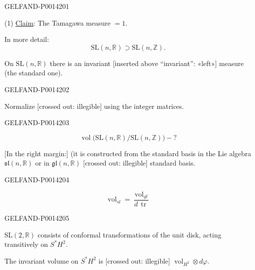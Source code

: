 \begin{GelfandAdjacentEvidence}{GELFAND-P001420}{1}


(1) \uline{Claim}: The Tamagawa measure \(=1\).

In more detail:
\[
\mathrm{SL}(n,\mathbb R)\supset\mathrm{SL}(n,\mathbb Z).
\]

On \(\mathrm{SL}(n,\mathbb R)\) there is an invariant
[inserted above “invariant”: «left»] measure (the standard one).
\end{GelfandAdjacentEvidence}
\begin{GelfandAdjacentEvidence}{GELFAND-P001420}{2}


Normalize [crossed out: illegible] using the integer matrices.
\end{GelfandAdjacentEvidence}
\begin{GelfandAdjacentEvidence}{GELFAND-P001420}{3}

\[
\operatorname{vol}\bigl(\mathrm{SL}(n,\mathbb R)/\mathrm{SL}(n,\mathbb Z)\bigr)-?
\]

[In the right margin:]
(it is constructed from the standard basis in the Lie algebra \(\mathfrak{sl}(n,\mathbb R)\) or in \(\mathfrak{gl}(n,\mathbb R)\)
[crossed out: illegible] standard basis.
\end{GelfandAdjacentEvidence}
\begin{GelfandAdjacentEvidence}{GELFAND-P001420}{4}

\[
\boxed{\operatorname{vol}_{sl}=\frac{\operatorname{vol}_{gl}}{d\,\operatorname{tr}}}
\]
\end{GelfandAdjacentEvidence}
\begin{GelfandAdjacentEvidence}{GELFAND-P001420}{5}


\(\mathrm{SL}(2,\mathbb R)\) consists of conformal transformations of the unit disk, acting transitively on
\(S^*H^2\).

The invariant volume on \(S^*H^2\) is [crossed out: illegible]
\(\operatorname{vol}_{H^2}\otimes d\varphi\).
\end{GelfandAdjacentEvidence}
